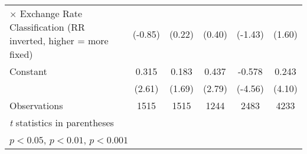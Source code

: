 {\begin{tabular}{l*{5}{c}}
$\times$ Exchange Rate Classification (RR inverted, higher = more fixed)&     (-0.85)         &      (0.22)         &      (0.40)         &     (-1.43)         &      (1.60)         \\
[1em]
Constant            &       0.315\sym{*}  &       0.183         &       0.437\sym{**} &      -0.578\sym{***}&       0.243\sym{***}\\
                    &      (2.61)         &      (1.69)         &      (2.79)         &     (-4.56)         &      (4.10)         \\
\hline
Observations        &        1515         &        1515         &        1244         &        2483         &        4233         \\
\hline\hline
\multicolumn{6}{l}{\footnotesize \textit{t} statistics in parentheses}\\
\multicolumn{6}{l}{\footnotesize \sym{*} \(p<0.05\), \sym{**} \(p<0.01\), \sym{***} \(p<0.001\)}\\
\end{tabular}
}

